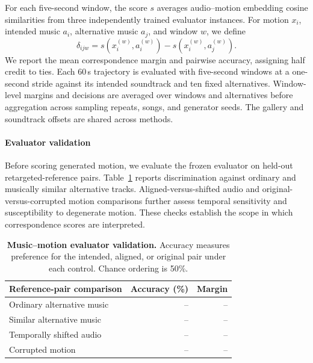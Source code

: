 For each five-second window, the score $s$ averages
audio--motion embedding cosine similarities from three
independently trained evaluator instances.
For motion $x_i$, intended music $a_i$, alternative
music $a_j$, and window $w$, we define
\begin{equation}
    \delta_{ijw}
    =
    s(x_i^{(w)},a_i^{(w)})
    -
    s(x_i^{(w)},a_j^{(w)}).
    \label{eq:mmr_margin}
\end{equation}
We report the mean correspondence margin and pairwise
accuracy, assigning half credit to ties.
Each 60\,s trajectory is evaluated with five-second
windows at a one-second stride against its intended
soundtrack and ten fixed alternatives.
Window-level margins and decisions are averaged over
windows and alternatives before aggregation across
sampling repeats, songs, and generator seeds.
The gallery and soundtrack offsets are shared across methods.

\paragraph{Evaluator validation}
\label{sec:evaluator_validation}
Before scoring generated motion, we evaluate the frozen
evaluator on held-out retargeted-reference pairs.
Table~\ref{tab:evaluator_validation} reports discrimination
against ordinary and musically similar alternative tracks.
Aligned-versus-shifted audio and original-versus-corrupted
motion comparisons further assess temporal sensitivity
and susceptibility to degenerate motion.
These checks establish the scope in which correspondence
scores are interpreted.

\begin{table}[t]
    \centering
    \small
    \caption{
    \textbf{Music--motion evaluator validation.}
    Accuracy measures preference for the intended,
    aligned, or original pair under each control.
    Chance ordering is 50\%.
    }
    \label{tab:evaluator_validation}
    \setlength{\tabcolsep}{4pt}
    \begin{tabular}{@{}lrr@{}}
        \toprule
        Reference-pair comparison
        & Accuracy (\%) & Margin \\
        \midrule
        Ordinary alternative music & -- & -- \\
        Similar alternative music  & -- & -- \\
        Temporally shifted audio   & -- & -- \\
        Corrupted motion           & -- & -- \\
        \bottomrule
    \end{tabular}
\end{table}

